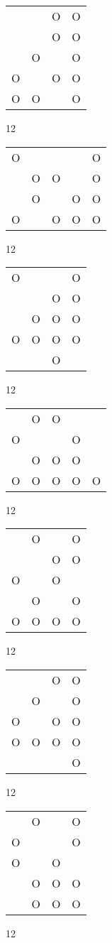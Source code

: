 \begin{tabular}{|m{0.2cm}m{0.2cm}m{0.2cm}m{0.2cm}|}\hline
 & &O&O\\
 & &O&O\\
 &O& &O\\
O& &O&O\\
O&O& &O\\
\hline\end{tabular}12
\begin{tabular}{|m{0.2cm}m{0.2cm}m{0.2cm}m{0.2cm}m{0.2cm}|}\hline
O& & & &O\\
 &O&O& &O\\
 &O& &O&O\\
O& &O&O&O\\
\hline\end{tabular}12
\begin{tabular}{|m{0.2cm}m{0.2cm}m{0.2cm}m{0.2cm}|}\hline
O& & &O\\
 & &O&O\\
 &O&O&O\\
O&O&O&O\\
 & &O& \\
\hline\end{tabular}12
\begin{tabular}{|m{0.2cm}m{0.2cm}m{0.2cm}m{0.2cm}m{0.2cm}|}\hline
 &O&O& & \\
O& & &O& \\
 &O&O&O& \\
O&O&O&O&O\\
\hline\end{tabular}12
\begin{tabular}{|m{0.2cm}m{0.2cm}m{0.2cm}m{0.2cm}|}\hline
 &O& &O\\
 & &O&O\\
O& &O& \\
 &O& &O\\
O&O&O&O\\
\hline\end{tabular}12
\begin{tabular}{|m{0.2cm}m{0.2cm}m{0.2cm}m{0.2cm}|}\hline
 & &O&O\\
 &O& &O\\
O& &O&O\\
O&O&O&O\\
 & & &O\\
\hline\end{tabular}12
\begin{tabular}{|m{0.2cm}m{0.2cm}m{0.2cm}m{0.2cm}|}\hline
 &O& &O\\
O& & &O\\
O& &O& \\
 &O&O&O\\
 &O&O&O\\
\hline\end{tabular}12
